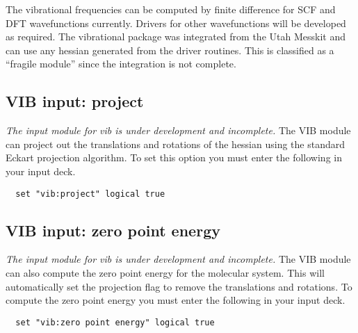 The vibrational frequencies can be computed by finite difference for
SCF and DFT wavefunctions currently.  Drivers for other wavefunctions
will be developed as required.  The vibrational package was integrated
from the Utah Messkit and can use any hessian generated from the
driver routines.  This is classified as a ``fragile module'' since the
integration is not complete.

\subsection{VIB input: project}
{\it The input module for vib is under development and incomplete.}
The VIB module can project out the translations and rotations of the
hessian using the standard Eckart projection algorithm.  To set this
option you must enter the following in your input deck.

\begin{verbatim}
  set "vib:project" logical true
\end{verbatim}

\subsection{VIB input: zero point energy}
{\it The input module for vib is under development and incomplete.}
The VIB module can also compute the zero point energy for the
molecular system.  This will automatically set the projection flag to
remove the translations and rotations.   To compute the zero point energy
you must enter the following in your input deck.

\begin{verbatim}
  set "vib:zero point energy" logical true
\end{verbatim}

